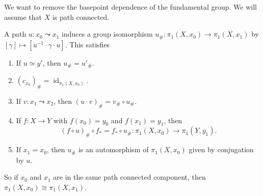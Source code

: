 \documentclass[a4paper, 10pt, twocolumn]{amsart}
\newcommand{\id}{\operatorname{id}}
\begin{document}
We want to remove the basepoint dependence of the fundamental group. We will assume that $X$ is path connected.

\begin{proposition}
  A path $u: x_0 \leadsto x_1$ induces a group isomorphism $u_\#: \pi_1(X, x_0) \rightarrow \pi_1(X, x_1)$ by $[\gamma] \mapsto [u^{-1} \cdot \gamma \cdot u]$. This satisfies
  \begin{enumerate}
    \item If $u \simeq y'$, then $u_\# = u'_\#$.
    \item $(c_{x_0})_\# = \id_{\pi_1(X, x_0)}$. 
    \item If $v: x_1 \leadsto x_2$, then $(u \cdot v)_\# = v_\# \circ u_\#$.
    \item If $f: X \rightarrow Y$ with $f(x_0) = y_0$ and $f(x_1) = y_1$, then
    $$
    (f\circ u)_\# \circ f_* = f_* \circ u_\#: \pi_1(X, x_0) \rightarrow \pi_1(Y, y_1).
    $$
    \item If $x_1 = x_0$, then $u_\#$ is an automorphism of $\pi_1(X, x_0)$ given by conjugation by $u$.
  \end{enumerate}
\end{proposition}

So if $x_0$ and $x_1$ are in the same path connected component, then $\pi_1(X, x_0) \cong \pi_1(X, x_1)$.
\end{document}
